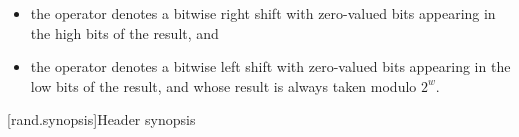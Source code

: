 \begin{itemize}
 \item
   the operator \rightshift{} denotes a bitwise right shift
   with zero-valued bits appearing in the high bits of the result, and
 \item
   the operator  denotes a bitwise left shift
   with zero-valued bits appearing in the low bits of the result,
   and whose result is always taken modulo $2^w$.
\end{itemize}




[rand.synopsis]{Header  synopsis}%


